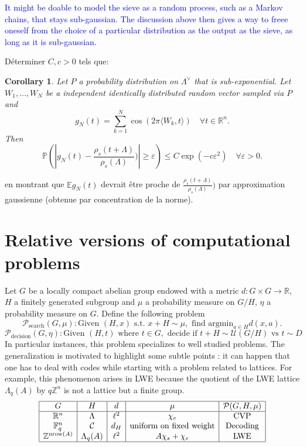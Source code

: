 \documentclass{article}
\newtheorem{corollary}{Corollary}[theorem]
\begin{document}
\textcolor{blue}{It might be doable to model the sieve as a random process, such as a Markov chains, that stays sub-gaussian. The discussion above then gives a way to freee oneself from the choice of a particular distribution as the output as the sieve, as long as it is sub-gaussian.}

Déterminer $C,c> 0$ tels que:
\begin{corollary}
Let $P$ a probability distribution on $\Lambda^\vee$ that is sub-exponential. Let $W_1,\ldots , W_N$ be a independent identically distributed random vector sampled via $P$ and 
\[g_N(t) = \sum_{k=1}^N\cos(2\pi \langle W_k,t\rangle )\quad\forall t\in\mathbb R^n.\] 
Then 
\[\mathbb P( |g_N(t) - \frac{\rho_s(t+\Lambda)}{\rho_s(\Lambda)}) |\geq \varepsilon ) \leq  C \exp( - c\varepsilon^2) \quad \forall \varepsilon >0.\]
\end{corollary}
en montrant que $\mathbb Eg_N(t) $ devrait être proche de $\frac{\rho_s(t+\Lambda)}{\rho_s(\Lambda)})$ par approximation gaussienne (obtenue par concentration de la norme).


\section{Relative versions of computational problems}%

Let $G$ be a locally compact abelian group endowed with a metric $d : G\times G \rightarrow \mathbb R$, $H$ a finitely generated subgroup and $\mu$ a probability measure on $G/H$, $\eta$ a probability measure on $G$. Define the following problem
$$\mathcal P_{\text{search}} (G,\mu) : \text{Given } (H,x) \text{ s.t. }x+H \sim \mu , \text{ find argmin}_{a\in H} d(x,a).$$
$$\mathcal P_{\text{decision}}(G,\eta) : \text{Given } (H,t) \text{ where } t\in G, \text{ decide if } t + H \sim \mathcal U(G/H) \text{ vs } t\sim D$$
In particular instances, this problem specializes to well studied problems. The generalization is motivated to highlight some subtle points : it can happen that one has to deal with codes while starting with a problem related to lattices. For example, this phenomenon arises in LWE because the quotient of the LWE lattice $\Lambda_q(A)$ by $q\mathbb Z^n$ is not a lattice but a finite group. 
\[\begin{array}{|c|c|c| c | c|} 
\hline
G             & H                          & d     &  \mu              & \mathcal P (G,H,\mu)\\
\hline
\mathbb R^n   & \Lambda                    & \ell^2 & \chi_e            & \text{CVP}     \\
\mathbb F_q^n & \mathcal C                 & d_H    & \text{uniform on fixed weight}    & \text{Decoding}\\
\mathbb Z^{\text{nrow}(A)}  & \Lambda_q(A) & \ell^2 &  A \chi_s +\chi_e & \text{LWE}     \\
\hline
\end{array}\]
\end{document}
